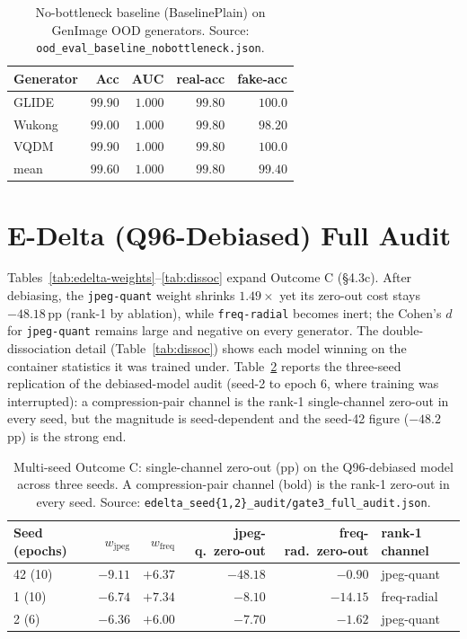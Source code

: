 \begin{table}[h]
  \centering
  \caption{No-bottleneck baseline (BaselinePlain) on GenImage OOD generators. Source:
    \texttt{ood\_eval\_baseline\_nobottleneck.json}.}
  \label{tab:baseline-ood}
  \small
  \begin{tabular}{lrrrr}
    \toprule
    Generator & Acc & AUC & real-acc & fake-acc \\
    \midrule
    GLIDE  & $99.90$ & $1.000$ & $99.80$ & $100.0$ \\
    Wukong & $99.00$ & $1.000$ & $99.80$ & $98.20$ \\
    VQDM   & $99.90$ & $1.000$ & $99.80$ & $100.0$ \\
    \midrule
    mean   & $99.60$ & $1.000$ & $99.80$ & $99.40$ \\
    \bottomrule
  \end{tabular}
\end{table}

\section{E-Delta (Q96-Debiased) Full Audit}
\label{app:edelta}

Tables~\ref{tab:edelta-weights}--\ref{tab:dissoc} expand Outcome C (\S{}4.3c). After
debiasing, the \texttt{jpeg-quant} weight shrinks $1.49\times$ yet its zero-out cost stays
$-48.18$\,pp (rank-1 by ablation), while \texttt{freq-radial} becomes inert; the Cohen's
$d$ for \texttt{jpeg-quant} remains large and negative on every generator. The
double-dissociation detail (Table~\ref{tab:dissoc}) shows each model winning on the
container statistics it was trained under. Table~\ref{tab:edelta-multiseed} reports the
three-seed replication of the debiased-model audit (seed-2 to epoch 6, where training was
interrupted): a compression-pair channel is the rank-1 single-channel zero-out in every seed,
but the magnitude is seed-dependent and the seed-42 figure ($-48.2$\,pp) is the strong end.

\begin{table}[h]
  \centering
  \caption{Multi-seed Outcome C: single-channel zero-out (pp) on the Q96-debiased model across
    three seeds. A compression-pair channel (bold) is the rank-1 zero-out in every seed.
    Source: \texttt{edelta\_seed\{1,2\}\_audit/gate3\_full\_audit.json}.}
  \label{tab:edelta-multiseed}
  \small
  \begin{tabular}{lrrrrl}
    \toprule
    Seed (epochs) & $w_{\text{jpeg}}$ & $w_{\text{freq}}$ & jpeg-q.\ zero-out & freq-rad.\ zero-out & rank-1 channel \\
    \midrule
    42 (10) & $-9.11$ & $+6.37$ & $\mathbf{-48.18}$ & $-0.90$           & jpeg-quant \\
    1 (10)  & $-6.74$ & $+7.34$ & $-8.10$           & $\mathbf{-14.15}$ & freq-radial \\
    2 (6)   & $-6.36$ & $+6.00$ & $\mathbf{-7.70}$  & $-1.62$           & jpeg-quant \\
    \bottomrule
  \end{tabular}
\end{table}

